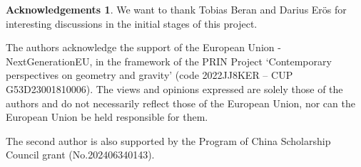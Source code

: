 \documentclass[hidelinks,12pt,a4paper]{article}
\numberwithin{equation}{section}
\theoremstyle{plain}
\theoremstyle{definition}
\newtheorem{remark}[definition]{Remark}
\newtheorem*{ack}{Acknowledgements}
\begin{document}
\begin{ack}
We want to thank Tobias Beran and Darius Er\"os for interesting discussions in the initial stages of this project. 

The authors acknowledge the support of the European Union - NextGenerationEU, in the framework of the PRIN Project `Contemporary perspectives on geometry and gravity' (code 2022JJ8KER – CUP G53D23001810006). The views and opinions expressed are solely those of the authors and do not necessarily reflect those of the European Union, nor can the European Union be held responsible for them. 

The second author is also supported by the Program of China Scholarship Council grant (No.202406340143). 
\end{ack}







 

\end{document}
